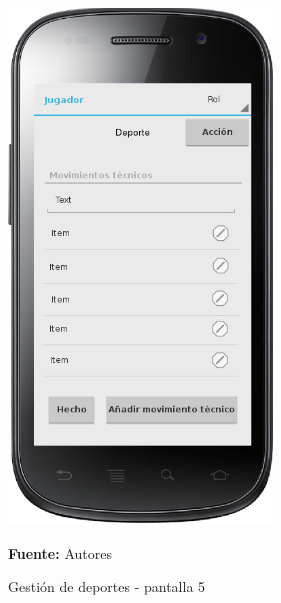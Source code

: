 \begin{figure}[!htb]
  \begin{center}
    \includegraphics[width=7cm]{./imagenes/UI/Deportes/gestion_deportes_5.png}
    \caption{Gestión de deportes - pantalla 5}
    \label{fig:gestion_deportes_5}
    \textbf{Fuente:}  Autores
  \end{center}
\end{figure}

